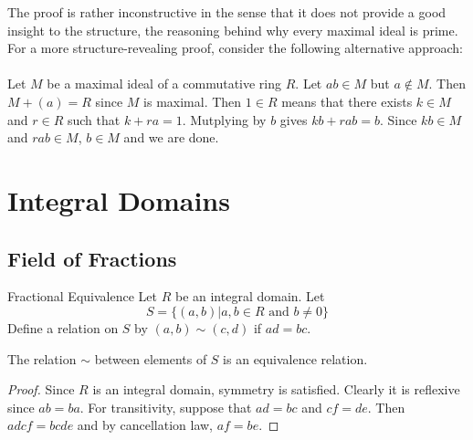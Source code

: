 \documentclass[a4paper]{article}
\begin{document}
The proof is rather inconstructive in the sense that it does not provide a good insight to the structure, the reasoning behind why every maximal ideal is prime. For a more structure-revealing proof, consider the following alternative approach: \\~\\
Let $M$ be a maximal ideal of a commutative ring $R$. Let $ab\in M$ but $a\notin M$. Then $M+(a)=R$ since $M$ is maximal. Then $1\in R$ means that there exists $k\in M$ and $r\in R$ such that $k+ra=1$. Mutplying by $b$ gives $kb+rab=b$. Since $kb\in M$ and $rab\in M$, $b\in M$ and we are done. 

\pagebreak
\section{Integral Domains}
\subsection{Field of Fractions}
\begin{defn}{Fractional Equivalence}{} Let $R$ be an integral domain. Let $$S=\{(a,b)|a,b\in R\text{ and }b\neq 0\}$$ Define a relation on $S$ by $(a,b)\sim(c,d)$ if $ad=bc$. 
\end{defn}

\begin{lmm}{}{} The relation $\sim$ between elements of $S$ is an equivalence relation. \tcbline
\begin{proof}
Since $R$ is an integral domain, symmetry is satisfied. Clearly it is reflexive since $ab=ba$. For transitivity, suppose that $ad=bc$ and $cf=de$. Then $adcf=bcde$ and by cancellation law, $af=be$. 
\end{proof}
\end{lmm}
\end{document}
